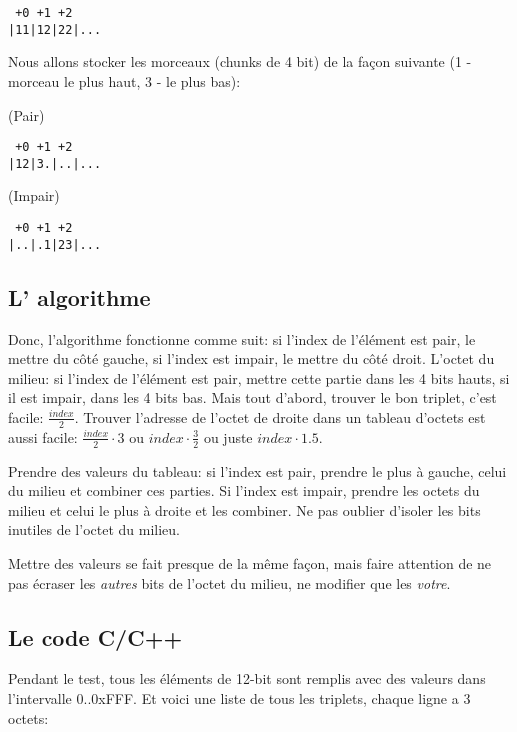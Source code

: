 \begin{lstlisting}
 +0 +1 +2
|11|12|22|...
\end{lstlisting}

Nous allons stocker les morceaux (chunks de 4 bit) de la façon suivante (1 - morceau
le plus haut, 3 - le plus bas):

(Pair)

\begin{lstlisting}
 +0 +1 +2
|12|3.|..|...
\end{lstlisting}

(Impair)

\begin{lstlisting}
 +0 +1 +2
|..|.1|23|...
\end{lstlisting}

\subsection{L' algorithme}

Donc, l'algorithme fonctionne comme suit: si l'index de l'élément est pair, le mettre
du côté gauche, si l'index est impair, le mettre du côté droit.
L'octet du milieu: si l'index de l'élément est pair, mettre cette partie dans les
4 bits hauts, si il est impair, dans les 4 bits bas.
Mais tout d'abord, trouver le bon triplet, c'est facile: $\frac{index}{2}$.
Trouver l'adresse de l'octet de droite dans un tableau d'octets est aussi facile: $\frac{index}{2} \cdot 3$
ou $index \cdot \frac{3}{2}$ ou juste $index \cdot 1.5$.

Prendre des valeurs du tableau: si l'index est pair, prendre le plus à gauche, celui
du milieu et combiner ces parties.
Si l'index est impair, prendre les octets du milieu et celui le plus à droite et
les combiner.
Ne pas oublier d'isoler les bits inutiles de l'octet du milieu.

Mettre des valeurs se fait presque de la même façon, mais faire attention de ne pas
écraser les \emph{autres} bits de l'octet du milieu, ne modifier que les \emph{votre}.

\subsection{Le code C/C++}



Pendant le test, tous les éléments de 12-bit sont remplis avec des valeurs dans l'intervalle
0..0xFFF.
Et voici une liste de tous les triplets, chaque ligne a 3 octets:

